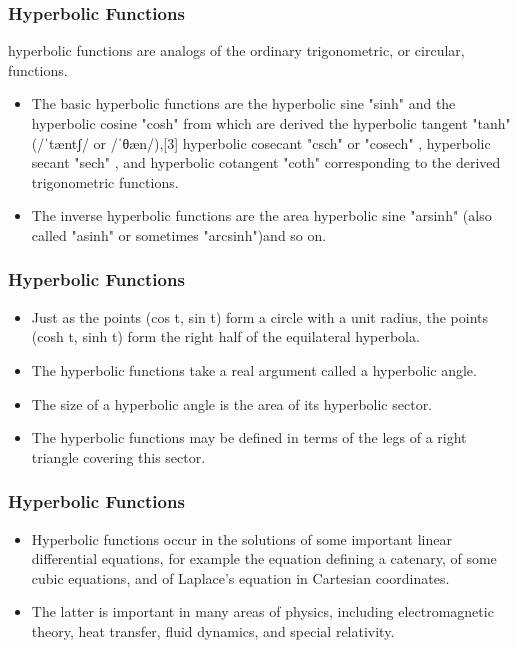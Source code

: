 \documentclass{beamer}
\begin{document}
\begin{frame}
	\frametitle{Hyperbolic Functions}	
	hyperbolic functions are analogs of the ordinary trigonometric, or circular, functions. 
	\begin{itemize}
	\item The basic hyperbolic functions are the hyperbolic sine "sinh" and the hyperbolic cosine "cosh"  from which are derived the hyperbolic tangent "tanh" (/ˈtæntʃ/ or /ˈθæn/),[3] hyperbolic cosecant "csch" or "cosech" , hyperbolic secant "sech" , and hyperbolic cotangent "coth" corresponding to the derived trigonometric functions. 
	\item The inverse hyperbolic functions are the area hyperbolic sine "arsinh" (also called "asinh" or sometimes "arcsinh")and so on.
	\end{itemize}
	
\end{frame}
\begin{frame}
	\frametitle{Hyperbolic Functions}
\begin{itemize}
\item Just as the points (cos t, sin t) form a circle with a unit radius, the points (cosh t, sinh t) form the right half of the equilateral hyperbola.\item  The hyperbolic functions take a real argument called a hyperbolic angle. 
\item The size of a hyperbolic angle is the area of its hyperbolic sector. 
\item The hyperbolic functions may be defined in terms of the legs of a right triangle covering this sector.
\end{itemize}

\end{frame}
\begin{frame}
\frametitle{Hyperbolic Functions}
\begin{itemize}
\item Hyperbolic functions occur in the solutions of some important linear differential equations, for example the equation defining a catenary, of some cubic equations, and of Laplace's equation in Cartesian coordinates.
\item The latter is important in many areas of physics, including electromagnetic theory, heat transfer, fluid dynamics, and special relativity.
\end{itemize}
\end{frame}
\end{document}
